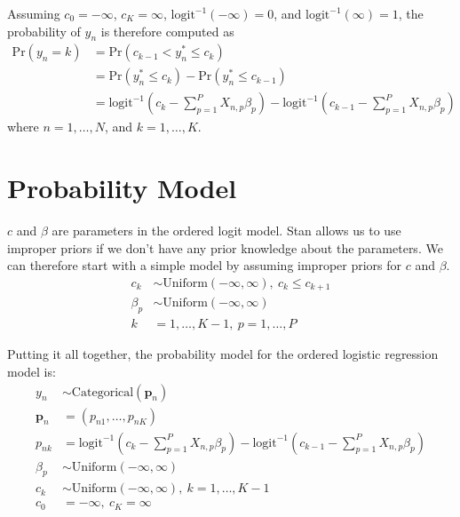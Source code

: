 \documentclass[12pt]{article}
\def\eqa{\left(c_k - \sum \limits_{p=1}^P X_{n,p}\beta_p \right)}
\def\eqb{\left(c_{k-1} - \sum \limits_{p=1}^P X_{n,p}\beta_p \right)}
\begin{document}
Assuming $c_0=-\infty$, $c_K=\infty$, $\mathrm{logit}^{-1}\left(-\infty\right)=0$, and $\mathrm{logit}^{-1}\left(\infty\right)=1$, the probability of $y_n$ is therefore computed as
\begin{align*}
 \mathrm{Pr}\left(y_n=k\right)&=\mathrm{Pr}\left(c_{k-1}<y^*_n\leq c_k\right)\\
 &= \mathrm{Pr}\left(y^*_n\leq c_k \right) - \mathrm{Pr}\left(y^*_n\leq c_{k-1} \right) \\
 &= \mathrm{logit}^{-1}\eqa - \mathrm{logit}^{-1}\eqb
\end{align*}
where $n=1,\ldots, N$, and $k=1, \ldots, K$.

\section{Probability Model}

$c$ and $\beta$ are parameters in the ordered logit model. Stan allows us to use improper priors if we don't have any prior knowledge about the parameters. We can therefore start with a simple model by assuming improper priors for $c$ and $\beta$.
\begin{align*}
  c_k &\sim \mathrm{Uniform}\left(-\infty, \infty \right), \ c_k \leq c_{k+1}\\
  \beta_p &\sim \mathrm{Uniform}\left(-\infty, \infty \right)\\
  k &=1,\ldots,K-1, \  p=1,\ldots,P
\end{align*}

Putting it all together, the probability model for the ordered logistic regression model is:
\begin{align*}
  y_n &\sim \mathrm{Categorical} \left(\mathbf{p}_n\right) \\
  \mathbf{p}_n &=\left(p_{n1},\ldots,p_{nK} \right) \\
  p_{nk} &= \mathrm{logit}^{-1}\eqa - \mathrm{logit}^{-1}\eqb \\
  \beta_p &\sim \mathrm{Uniform}\left(-\infty, \infty \right)\\
  c_k &\sim \mathrm{Uniform}\left(-\infty, \infty \right), \ k=1,\ldots,K-1 \\
  c_0 &= -\infty, \ c_K = \infty
\end{align*}
\end{document}
